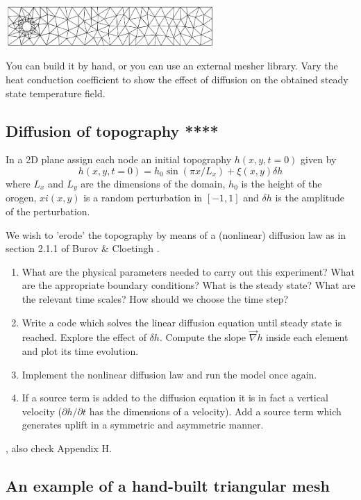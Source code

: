 \includegraphics[width=8cm]{images/compgeo/hole}

You can build it 
by hand, or you can use an external mesher library.
Vary the heat conduction coefficient to show the effect of diffusion on the obtained
steady state temperature field.  

\subsection{Diffusion of topography ****}

In a 2D plane assign each node an initial topography $h(x,y,t=0)$ given by 
\[
h(x,y,t=0)= h_0 \sin(\pi x/L_x) + \xi(x,y) \delta h
\]
where $L_x$ and $L_y$ are the dimensions of the domain, $h_0$ is the 
height of the orogen, $xi(x,y)$ is a random perturbation in $[-1,1]$
and $\delta h$ is the amplitude of the perturbation.

We wish to 'erode' the topography by means of a (nonlinear) diffusion law
as in section 2.1.1 of Burov \& Cloetingh \cite{bucl97}.

\begin{enumerate}
\item What are the physical parameters needed to carry out this experiment? 
What are the appropriate boundary conditions? 
What is the steady state? What are the relevant time scales? How should we choose the time step?
\item Write a code which solves the linear diffusion equation until steady state is reached.
Explore the effect of $\delta h$. Compute the slope $\vec\nabla h$ inside each element and plot 
its time evolution. 
\item Implement the nonlinear diffusion law and run the model once again. 
\item If a source term is added to the diffusion equation it is in fact a vertical velocity
($\partial h/\partial t$ has the dimensions of a velocity). Add a source term which generates 
uplift in a symmetric and asymmetric manner.  
\end{enumerate}

\Literature  \cite{thsh14} \cite{ster20}, also check Appendix H. 

\subsection{An example of a hand-built triangular mesh}

